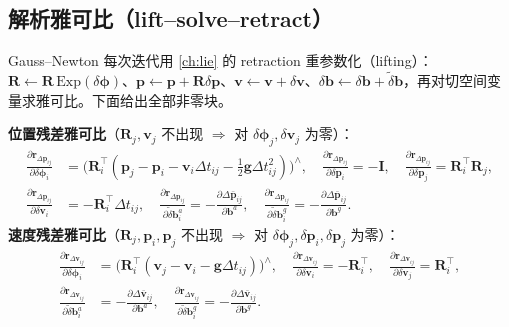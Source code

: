 \subsection{解析雅可比（lift--solve--retract）}
\label{subsec:imu-jacobians}

Gauss--Newton 每次迭代用 \cref{ch:lie} 的 retraction 重参数化（lifting）：$\mathbf R\leftarrow\mathbf R\,\mathrm{Exp}(\delta\boldsymbol\phi)$、$\mathbf p\leftarrow\mathbf p+\mathbf R\delta\mathbf p$、$\mathbf v\leftarrow\mathbf v+\delta\mathbf v$、$\delta\mathbf b\leftarrow\delta\mathbf b+\tilde\delta\mathbf b$，再对切空间变量求雅可比。下面给出全部非零块\cite{forster2017preintegration}。

\textbf{位置残差雅可比}（$\mathbf R_j,\mathbf v_j$ 不出现 $\Rightarrow$ 对 $\delta\boldsymbol\phi_j,\delta\mathbf v_j$ 为零）：
\begin{align}
  \frac{\partial\mathbf r_{\Delta\mathbf p_{ij}}}{\partial\delta\boldsymbol\phi_i}&=\Big(\mathbf R_i^\top(\mathbf p_j-\mathbf p_i-\mathbf v_i\Delta t_{ij}-\tfrac12\mathbf g\Delta t_{ij}^2)\Big)^\wedge,\quad
  \frac{\partial\mathbf r_{\Delta\mathbf p_{ij}}}{\partial\delta\mathbf p_i}=-\mathbf I,\quad
  \frac{\partial\mathbf r_{\Delta\mathbf p_{ij}}}{\partial\delta\mathbf p_j}=\mathbf R_i^\top\mathbf R_j,\nonumber\\
  \frac{\partial\mathbf r_{\Delta\mathbf p_{ij}}}{\partial\delta\mathbf v_i}&=-\mathbf R_i^\top\Delta t_{ij},\quad
  \frac{\partial\mathbf r_{\Delta\mathbf p_{ij}}}{\partial\tilde\delta\mathbf b_i^a}=-\frac{\partial\Delta\bar{\mathbf p}_{ij}}{\partial\mathbf b^a},\quad
  \frac{\partial\mathbf r_{\Delta\mathbf p_{ij}}}{\partial\tilde\delta\mathbf b_i^g}=-\frac{\partial\Delta\bar{\mathbf p}_{ij}}{\partial\mathbf b^g}.
  \label{eq:jac-p}
\end{align}
\textbf{速度残差雅可比}（$\mathbf R_j,\mathbf p_i,\mathbf p_j$ 不出现 $\Rightarrow$ 对 $\delta\boldsymbol\phi_j,\delta\mathbf p_i,\delta\mathbf p_j$ 为零）：
\begin{align}
  \frac{\partial\mathbf r_{\Delta\mathbf v_{ij}}}{\partial\delta\boldsymbol\phi_i}&=\big(\mathbf R_i^\top(\mathbf v_j-\mathbf v_i-\mathbf g\Delta t_{ij})\big)^\wedge,\quad
  \frac{\partial\mathbf r_{\Delta\mathbf v_{ij}}}{\partial\delta\mathbf v_i}=-\mathbf R_i^\top,\quad
  \frac{\partial\mathbf r_{\Delta\mathbf v_{ij}}}{\partial\delta\mathbf v_j}=\mathbf R_i^\top,\nonumber\\
  \frac{\partial\mathbf r_{\Delta\mathbf v_{ij}}}{\partial\tilde\delta\mathbf b_i^a}&=-\frac{\partial\Delta\bar{\mathbf v}_{ij}}{\partial\mathbf b^a},\quad
  \frac{\partial\mathbf r_{\Delta\mathbf v_{ij}}}{\partial\tilde\delta\mathbf b_i^g}=-\frac{\partial\Delta\bar{\mathbf v}_{ij}}{\partial\mathbf b^g}.
  \label{eq:jac-v}
\end{align}

